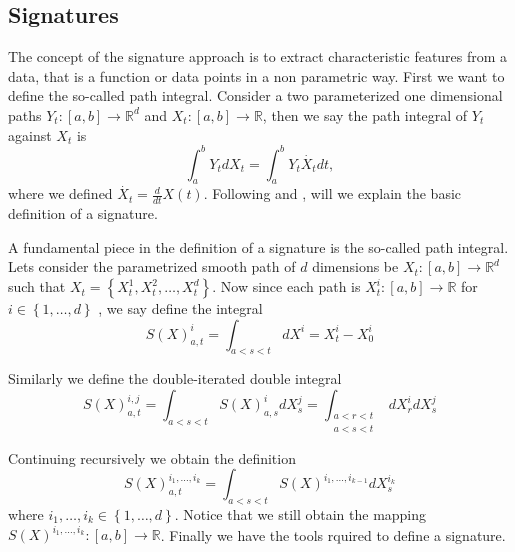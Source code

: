 

\subsection{Signatures}%
\label{sec:background}



The concept of the signature approach is to extract characteristic features from a data, that is a function or data points in a non parametric way.
First we want to define the so-called path integral.
Consider a two parameterized one dimensional paths  $Y_{t}: [a,b] \to  \mathbb{R} ^{d} $ and $X_t: [a,b] \to \mathbb{R} $, then we say the path integral of $Y_{t}$ against $X_{t}$  is \begin{equation}
    \int_{a}^{b} Y_{t} dX_{t} = \int_{a}^{b}  Y_{t} \dot{X_{t}}dt,
\end{equation}  where we defined $ \dot{X_{t}} = \frac{d}{dt}X( t)   $. Following \cite{Reizenstein2016} and  \cite{chevyrev2016primer}, will we explain the basic definition of a signature.



A fundamental piece in the definition of a signature is
the so-called path integral.
Lets consider the parametrized smooth path of $d$ dimensions be $X_{t}: \left[ a,b \right] \to  \mathbb{R} ^{d}  $ such that $X_{t} = \left\{ X^{1}_{t},  X_{t}^{2}, \ldots, X_{t}^{d} \right\} $. Now since each path is $X^{i}_{t}: [a,b] \to
\mathbb{R} $ for $i \in \left\{ 1, \ldots, d \right\} $ , we say define the integral \begin{equation}
    S( X)_{a,t}^{i} =  \int_{a < s < t}^{} dX^{i} = X^{i}_{t} - X_{0}^{i}
\end{equation}

Similarly we define the double-iterated double integral \begin{equation*}
    S( X)^{i,j}_{a,t} = \int_{a < s<t}^{} S( X)_{a,s}^{i}dX^{j}_{s} = \int_{\substack{a < r < t \\ a < s < t}}^{} dX^{i}_{r} dX^{j}_{s}
\end{equation*}


 Continuing recursively we obtain the definition \begin{equation*}
     S( X) _{a,t}^{i_{1},\ldots, i_{k}} =  \int_{a < s <t}^{} S( X) ^{i_{1}, \ldots, i_{k-1}} dX^{i_{k}}_{s}
 \end{equation*}
 where $i_{1}, \ldots, i_{k} \in \left\{ 1, \ldots, d \right\} $. Notice that we still obtain the mapping $S( X)^{i_{1}, \ldots, i_{k}}: [a,b] \to \mathbb{R}  $.  Finally we have the tools rquired to define a signature.


